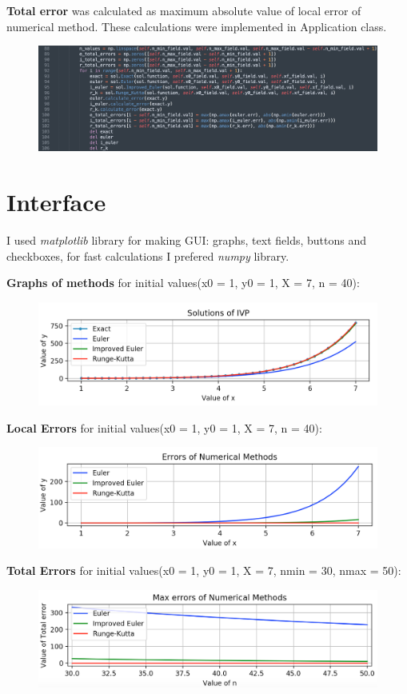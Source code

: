 \documentclass{article}
\begin{document}
\textbf{Total error} was calculated as maximum absolute value of local error of numerical method. These calculations were implemented in Application class.
\begin{figure}[h]
      \includegraphics[width=\linewidth]{total_error.png}
      \label{fig: total_error}
\end{figure}

\section{Interface}
I used \textit{matplotlib} library for making GUI: graphs, text fields, buttons and checkboxes, for fast calculations I prefered \textit{numpy} library.

\textbf{Graphs of methods} for initial values(x0 = 1, y0 = 1, X = 7, n = 40):
\begin{figure}[h]
      \includegraphics[width=0.8\linewidth]{exact_i.png}
      \label{fig: i1}
\end{figure}

\newpage
\textbf{Local Errors} for initial values(x0 = 1, y0 = 1, X = 7, n = 40):
\begin{figure}[h]
      \includegraphics[width=0.8\linewidth]{local_i.png}
      \label{fig: i2}
\end{figure}

\textbf{Total Errors} for initial values(x0 = 1, y0 = 1, X = 7, nmin = 30, nmax = 50):
\begin{figure}[h]
      \includegraphics[width=0.8\linewidth]{total_i.png}
      \label{fig: i3}
\end{figure}
\end{document}
